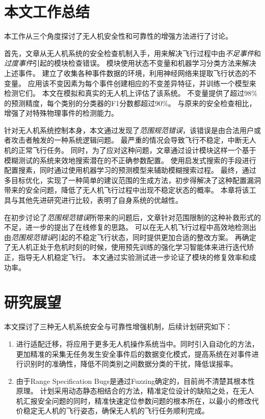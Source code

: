 \section{本文工作总结}
本工作从三个角度探讨了无人机安全性和可靠性的增强方法进行了讨论。

首先，文章从无人机系统的安全检查机制入手，用来解决飞行过程中由\emph{不足事件}和\emph{过度事件}引起的模块检查错误。
\deccheck 模块使用状态不变量和机器学习分类方法来解决上述事件。
\deccheck 建立了收集各种事件数据的环境，利用神经网络来提取飞行状态的不变量。
\deccheck 应用该不变因素为每个事件创建相应的不变差异特征，并训练一个模型来检测它们。
本文在模拟和真实的无人机上评估了该系统。
不变量提供了超过98\%的预测精度，每个类别的分类器的F1分数都超过90\%。
与原来的安全检查相比，\deccheck 增强了对特殊物理事件的检测能力。

针对无人机系统控制本身，本文通过\icsearcher 发现了\emph{范围规范错误}，该错误是由合法用户或者攻击者触发的一种系统逻辑问题。
最严重的情况会导致飞行不稳定，中断无人机的正常飞行任务。
同时，为了应对这种问题，文章通过设计\icsearcher 模块这样一个基于模糊测试的系统来效地搜索潜在的不正确参数配置。
\icsearcher 使用启发式搜索的手段进行配置搜素，同时通过使用机器学习的预测模型来辅助模糊搜索过程。
最终，通过多目标优化，\icsearcher 实现了一种简单的建议范围的生成方法，初步得解决了这种配置漏洞带来的安全问题，降低了无人机飞行过程中出现不稳定状态的概率。
本章将该工具与其他先进研究进行比较，表明了\icsearcher 自身系统的优越性。

在初步讨论了\emph{范围规范错误}所带来的问题后，文章针对范围限制的这种补救形式的不足，进一步的提出了在线修复的思路。
\nyctea 可以在无人机飞行过程中高效地检测出由\emph{范围规范错误}引起的不稳定飞行状态，同时提供更加合适的整改方案。
再确定了无人机正处于危机时刻的时候，\nyctea 使用预先训练的强化学习智能体来进行迭代矫正，指导无人机稳定飞行。
本文通过实验测试进一步论证了\nyctea 模块的修复效率和成功率。


\section{研究展望}
本文探讨了三种无人机系统安全与可靠性增强机制，后续计划研究如下：
\begin{enumerate}
    \item 进行适配迁移，将\deccheck 应用于更多无人机操作系统当中。同时引入自动化的方法，更加精准的采集无任务发生安全事件后的数据变化模式，提高系统在对事件进行识别时的准确性，降低不同类别之间数据分类的干扰，降低误报率。

    \item 由于Range Specification Bugs是通过Fuzzing确定的，目前尚不清楚其根本性原理。
    计划采用动态静态相结合的方法，精准定位设计的缺陷之处，在无人机汇报安全问题的同时，精准快速定位参数问题的根本所在，以最小的修改代价稳定无人机的飞行姿态，确保无人机的飞行任务顺利完成。
    
\end{enumerate}